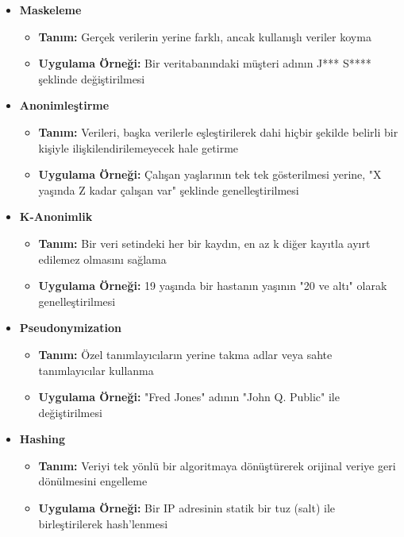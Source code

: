 \begin{itemize}
    \item \textbf{Maskeleme}
    \begin{itemize}
        \item \textbf{Tanım:} Gerçek verilerin yerine farklı, ancak kullanışlı veriler koyma
        \item \textbf{Uygulama Örneği:} Bir veritabanındaki müşteri adının J*** S**** şeklinde değiştirilmesi
    \end{itemize}
    
    \item \textbf{Anonimleştirme}
    \begin{itemize}
        \item \textbf{Tanım:} Verileri, başka verilerle eşleştirilerek dahi hiçbir şekilde belirli bir kişiyle ilişkilendirilemeyecek hale getirme
        \item \textbf{Uygulama Örneği:} Çalışan yaşlarının tek tek gösterilmesi yerine, "X yaşında Z kadar çalışan var" şeklinde genelleştirilmesi
    \end{itemize}
    
    \item \textbf{K-Anonimlik}
    \begin{itemize}
        \item \textbf{Tanım:} Bir veri setindeki her bir kaydın, en az k diğer kayıtla ayırt edilemez olmasını sağlama
        \item \textbf{Uygulama Örneği:} 19 yaşında bir hastanın yaşının "20 ve altı" olarak genelleştirilmesi
    \end{itemize}
    
    \item \textbf{Pseudonymization}
    \begin{itemize}
        \item \textbf{Tanım:} Özel tanımlayıcıların yerine takma adlar veya sahte tanımlayıcılar kullanma
        \item \textbf{Uygulama Örneği:} "Fred Jones" adının "John Q. Public" ile değiştirilmesi
    \end{itemize}
    
    \item \textbf{Hashing}
    \begin{itemize}
        \item \textbf{Tanım:} Veriyi tek yönlü bir algoritmaya dönüştürerek orijinal veriye geri dönülmesini engelleme
        \item \textbf{Uygulama Örneği:} Bir IP adresinin statik bir tuz (salt) ile birleştirilerek hash'lenmesi
    \end{itemize}
\end{itemize}

